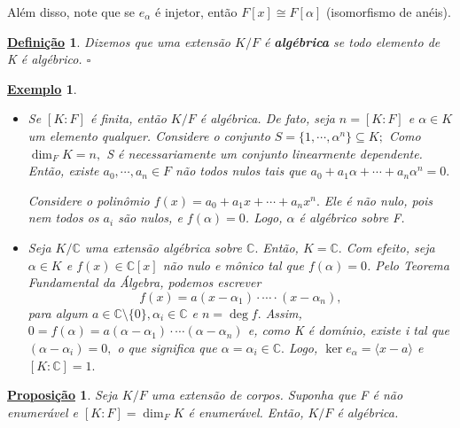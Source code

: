 \documentclass{article}
\newtheorem*{def*}{\underline{Defini\c c\~ao}}
\newtheorem*{prop*}{\underline{Proposi\c c\~ao}}
\newtheorem{example}{\underline{Exemplo}}
\begin{document}
  Além disso, note que se \(e_{\alpha }\) é injetor, então \(F[x]\cong{F[\alpha ]}\) (isomorfismo de anéis).
 \begin{def*}
   Dizemos que uma extensão \(K/F\) é \textbf{algébrica} se todo elemento de K é algébrico. \(\square\)
 \end{def*}
 \begin{example}
  \begin{itemize}
    \item[1)] Se \([K:F]\) é finita, então \(K/F\) é algébrica. De fato, seja \(n=[K:F]\) e \(\alpha \in K\) um elemento qualquer.
Considere o conjunto \(S = \{1, \cdots, \alpha ^{n}\}\subseteq{K};\) Como \(\dim_{F}K = n,\) S é necessariamente um conjunto linearmente
dependente. Então, existe \(a_{0}, \cdots, a_{n}\in F\) não todos nulos tais que \(a_{0} + a_{1}\alpha + \cdots + a_{n}\alpha^{n} = 0.\)

  Considere o polinômio \(f(x) = a_{0}+a_{1}x + \cdots + a_{n}x^{n}.\) Ele é não nulo, pois nem todos os \(a_{i}\) são nulos,
e \(f(\alpha ) = 0\). Logo, \(\alpha \) é algébrico sobre F.

  \item[2)] Seja \(K/\mathbb{C}\) uma extensão algébrica sobre \(\mathbb{C}.\) Então, \(K = \mathbb{C}.\) Com efeito, seja \(\alpha \in K\)
e \(f(x)\in \mathbb{C}[x]\) não nulo e mônico tal que \(f(\alpha ) = 0\). Pelo Teorema Fundamental da Álgebra, podemos escrever 
  \[
    f(x) = a(x-\alpha_{1})\cdot \cdots \cdot (x-\alpha_{n}),
  \]
  para algum \(a\in \mathbb{C}\setminus{\{0\}},\alpha_{i}\in \mathbb{C}\) e \(n = \deg{f}.\) Assim, \(0 = f(\alpha ) = a(\alpha -\alpha_{1})\cdot \cdots(\alpha -\alpha_{n})\)
e, como K é domínio, existe i tal que \((\alpha -\alpha_{i})=0,\) o que significa que \(\alpha=\alpha_{i}\in \mathbb{C}.\) Logo, \(\ker{e_{\alpha }}=\langle x-a \rangle\) e \([K:\mathbb{C}] = 1.\)
\end{itemize}
\end{example}
\begin{prop*}
  Seja \(K/F\) uma extensão de corpos. Suponha que F é não enumerável e \([K:F]=\dim_{F}K\) é enumerável. Então,
 \(K/F\) é algébrica.
\end{prop*}
\end{document}
